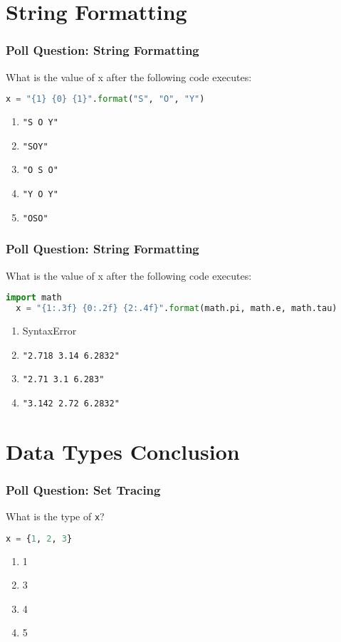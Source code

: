 \documentclass[xcolor=table]{beamer}
\begin{document}
\section{String Formatting}

\begin{frame}[fragile]
  \frametitle{Poll Question: String Formatting}
  What is the value of x after the following code executes:
  \begin{lstlisting}[language=Python, autogobble] 
  x = "{1} {0} {1}".format("S", "O", "Y")
  \end{lstlisting}
  \vfill
  \begin{enumerate}[A] 
    \item \lstinline|"S O Y"|
    \item \lstinline|"SOY"|
    \item \lstinline|"O S O"| %
    \item \lstinline|"Y O Y"|
    \item \lstinline|"OSO"|
  \end{enumerate}
\end{frame}

\begin{frame}[fragile]
  \frametitle{Poll Question: String Formatting}
  What is the value of x after the following code executes:
  \begin{lstlisting}[language=Python, autogobble] 
  import math
  x = "{1:.3f} {0:.2f} {2:.4f}".format(math.pi, math.e, math.tau)
  \end{lstlisting}
  \vfill
  \begin{enumerate}[A] 
    \item SyntaxError
    \item \lstinline|"2.718 3.14 6.2832"|
    \item \lstinline|"2.71 3.1 6.283"| 
    \item \lstinline|"3.142 2.72 6.2832"|
  \end{enumerate}
\end{frame}

\section{Data Types Conclusion}

%
%
%
\begin{frame}[fragile]
  \frametitle{Poll Question: Set Tracing}
  What is the type of \lstinline|x|?
  \begin{lstlisting}[language=Python, autogobble]
  x = {1, 2, 3}
  \end{lstlisting}
  \vfill
  \begin{enumerate}[A] 
    \item 1
    \item 3
    \item 4
    \item 5
  \end{enumerate}
\end{frame}
\end{document}
